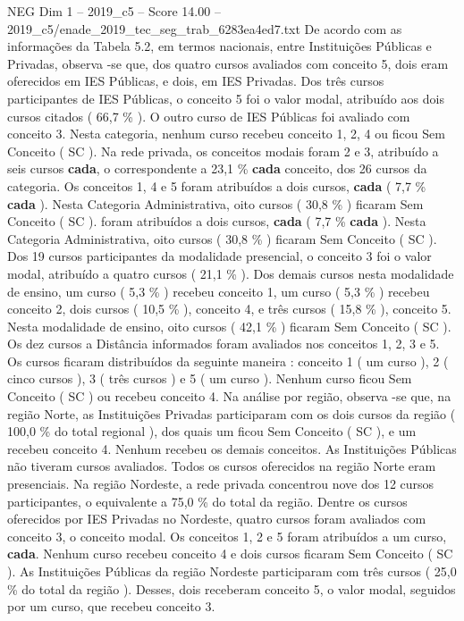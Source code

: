 \begin{textsample}{NEG Dim 1 – 2019\_c5 – Score 14.00 – 2019\_c5/enade\_2019\_tec\_seg\_trab\_6283ea4ed7.txt}
De acordo com as informações da Tabela 5.2, em termos nacionais, entre Instituições Públicas e Privadas, observa -se que, dos quatro cursos avaliados com conceito 5, dois eram oferecidos em IES Públicas, e dois, em IES Privadas.
Dos três cursos participantes de IES Públicas, o conceito 5 foi o valor modal, atribuído aos dois cursos citados ( 66,7 \% ).
O outro curso de IES Públicas foi avaliado com conceito 3.
Nesta categoria, nenhum curso recebeu conceito 1, 2, 4 ou ficou Sem Conceito ( SC ).
Na rede privada, os conceitos modais foram 2 e 3, atribuído a seis cursos \textbf{cada}, o correspondente a 23,1 \% \textbf{cada} conceito, dos 26 cursos da categoria.
Os conceitos 1, 4 e 5 foram atribuídos a dois cursos, \textbf{cada} ( 7,7 \% \textbf{cada} ).
Nesta Categoria Administrativa, oito cursos ( 30,8 \% ) ficaram Sem Conceito ( SC ). foram atribuídos a dois cursos, \textbf{cada} ( 7,7 \% \textbf{cada} ).
Nesta Categoria Administrativa, oito cursos ( 30,8 \% ) ficaram Sem Conceito ( SC ).
Dos 19 cursos participantes da modalidade presencial, o conceito 3 foi o valor modal, atribuído a quatro cursos ( 21,1 \% ).
Dos demais cursos nesta modalidade de ensino, um curso ( 5,3 \% ) recebeu conceito 1, um curso ( 5,3 \% ) recebeu conceito 2, dois cursos ( 10,5 \% ), conceito 4, e três cursos ( 15,8 \% ), conceito 5.
Nesta modalidade de ensino, oito cursos ( 42,1 \% ) ficaram Sem Conceito ( SC ).
Os dez cursos a Distância informados foram avaliados nos conceitos 1, 2, 3 e 5.
Os cursos ficaram distribuídos da seguinte maneira : conceito 1 ( um curso ), 2 ( cinco cursos ), 3 ( três cursos ) e 5 ( um curso ).
Nenhum curso ficou Sem Conceito ( SC ) ou recebeu conceito 4.
Na análise por região, observa -se que, na região Norte, as Instituições Privadas participaram com os dois cursos da região ( 100,0 \% do total regional ), dos quais um ficou Sem Conceito ( SC ), e um recebeu conceito 4.
Nenhum recebeu os demais conceitos.
As Instituições Públicas não tiveram cursos avaliados.
Todos os cursos oferecidos na região Norte eram presenciais.
Na região Nordeste, a rede privada concentrou nove dos 12 cursos participantes, o equivalente a 75,0 \% do total da região.
Dentre os cursos oferecidos por IES Privadas no Nordeste, quatro cursos foram avaliados com conceito 3, o conceito modal.
Os conceitos 1, 2 e 5 foram atribuídos a um curso, \textbf{cada}.
Nenhum curso recebeu conceito 4 e dois cursos ficaram Sem Conceito ( SC ).
As Instituições Públicas da região Nordeste participaram com três cursos ( 25,0 \% do total da região ).
Desses, dois receberam conceito 5, o valor modal, seguidos por um curso, que recebeu conceito 3.

\end{textsample}

